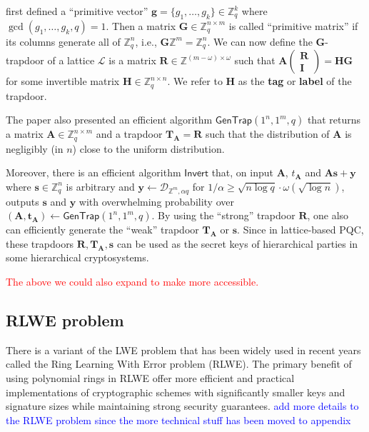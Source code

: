 \documentclass[cryptography,review,submit,pdftex,moreauthors,amsmath,amssymb,aps,strict]{Definitions/mdpi}
\newcommand{\peter}[1]{\textcolor{red}{#1}}
\newcommand{\minh}[1]{\textcolor{blue}{#1}}
\begin{document}
\cite{MP12} first defined a ``primitive vector'' $\mathbf{g}=\{g_1,\dots,g_k\}\in\mathbb{Z}^k_q$ where $\gcd(g_1,\dots,g_k,q)=1$. Then
a matrix $\mathbf{G}\in\mathbb{Z}^{n\times m}_q$ is called ``primitive matrix'' if its columns generate all of $\mathbb{Z}^n_q$, i.e., $\mathbf{G}\mathbb{Z}^m=\mathbb{Z}^n_q$. We can now define the $\mathbf{G}$-trapdoor of a lattice $\mathcal{L}$ is a matrix $\mathbf{R}\in\mathbb{Z}^{(m-\omega)\times \omega}$ such that $\mathbf{A}\begin{pmatrix}
    \mathbf{R}\\ 
    \mathbf{I}
  \end{pmatrix} = \mathbf{H}\mathbf{G}$ for some invertible matrix $\mathbf{H}\in\mathbb{Z}^{n\times n}_q$. We refer to $\mathbf{H}$ as the \textbf{tag} or \textbf{label} of the trapdoor. 

The paper also presented an efficient algorithm $\mathsf{GenTrap}(1^n,1^m,q)$ that returns a matrix $\mathbf{A}\in\mathbb{Z}^{n\times m}_q$ and a trapdoor $\mathbf{T}_{\mathbf{A}}=\mathbf{R}$ such that the distribution of $\mathbf{A}$ is negligibly (in $n$) close to the uniform distribution. 

Moreover, there is an efficient algorithm $\mathsf{Invert}$ that, on input $\mathbf{A}$, $t_{\mathbf{A}}$ and $\mathbf{A}\mathbf{s}+\mathbf{y}$ where $\mathbf{s}\in\mathbb{Z}^n_q$ is arbitrary and $\mathbf{y}\gets \mathcal{D}_{\mathbb{Z}^m,\alpha q}$ for $1/\alpha \geq \sqrt{n\log q}\cdot \omega(\sqrt{\log n})$, outputs $\mathbf{s}$ and $\mathbf{y}$ with overwhelming probability over $(\mathbf{A},\mathbf{t}_{\mathbf{A}})\gets \mathsf{GenTrap}(1^n,1^m,q)$. By using the ``strong'' trapdoor $\mathbf{R}$, one also can efficiently generate the ``weak'' trapdoor $\mathbf{T}_{\mathbf{A}}$ or $\mathbf{s}$. Since in lattice-based PQC, these trapdoors $\mathbf{R},\mathbf{T}_{\mathbf{A}}, \mathbf{s}$ can be used as the secret keys of hierarchical parties in some hierarchical cryptosystems.

\peter{The above we could also expand to make more accessible.}

\subsection{RLWE problem}

There is a variant of the LWE problem that has been widely used in recent years called the Ring Learning With Error problem (RLWE). The primary benefit of using polynomial rings in RLWE offer more efficient and practical implementations of cryptographic schemes with significantly smaller keys and signature sizes while maintaining strong security guarantees.
\minh{add more details to the RLWE problem since the more technical stuff has been moved to appendix}
\end{document}
